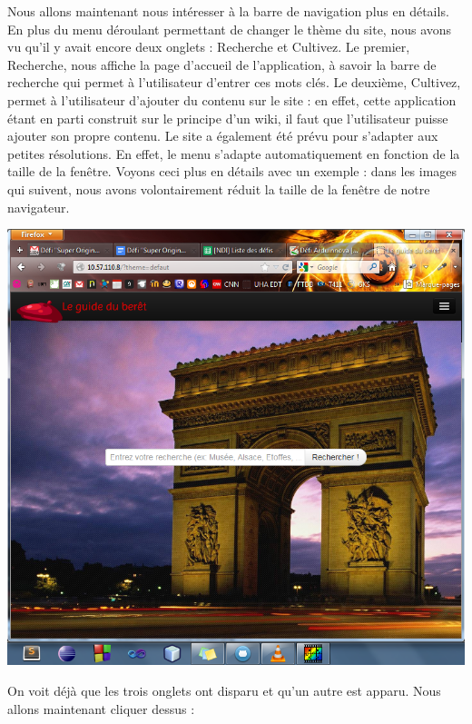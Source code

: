 \documentclass[12pt, a4paper]{article}
\newcommand{\espace}{\vspace{.8cm}}
\begin{document}
\espace{}
Nous allons maintenant nous intéresser à la barre de navigation plus en détails. En plus du menu déroulant permettant de changer le thème du site, nous avons vu qu'il y avait encore deux onglets : \og{}Recherche\fg{} et \og{}Cultivez\fg{}.
Le premier, \og{}Recherche\fg{}, nous affiche la page d'accueil de l'application, à savoir la barre de recherche qui permet à l'utilisateur d'entrer ces mots clés. Le deuxième, \og{}Cultivez\fg{}, permet à l'utilisateur d'ajouter du contenu sur le site : en effet, cette application étant en parti construit sur le principe d'un wiki, il faut que l'utilisateur puisse ajouter son propre contenu.
Le site a également été prévu pour s'adapter aux petites résolutions. En effet, le menu s'adapte automatiquement en fonction de la taille de la fenêtre. Voyons ceci plus en détails avec un exemple : dans les images qui suivent, nous avons volontairement réduit la taille de la fenêtre de notre navigateur.
\espace{}
\begin{center}
\includegraphics[width=.9\textwidth, keepaspectratio=true]{img/accueil4.png}
\end{center}
\espace{}

On voit déjà que les trois onglets ont disparu et qu'un autre est apparu. Nous allons maintenant cliquer dessus : 
\end{document}
